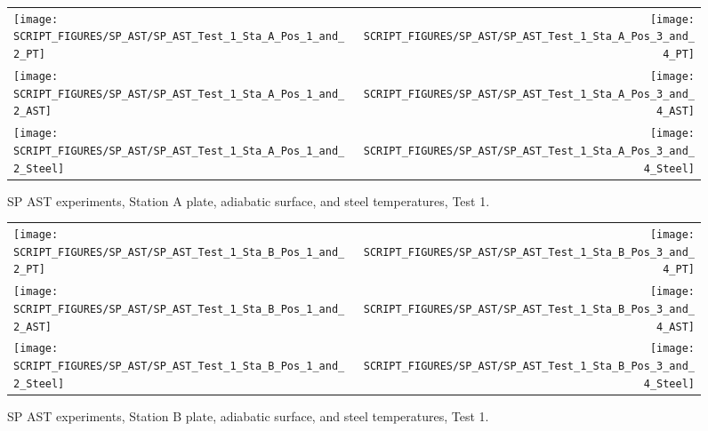 \newpage


\begin{figure}[p]
\begin{tabular*}{\textwidth}{l@{\extracolsep{\fill}}r}
\texttt{[image: SCRIPT\_FIGURES/SP\_AST/SP\_AST\_Test\_1\_Sta\_A\_Pos\_1\_and\_2\_PT]} &
\texttt{[image: SCRIPT\_FIGURES/SP\_AST/SP\_AST\_Test\_1\_Sta\_A\_Pos\_3\_and\_4\_PT]} \\
\texttt{[image: SCRIPT\_FIGURES/SP\_AST/SP\_AST\_Test\_1\_Sta\_A\_Pos\_1\_and\_2\_AST]} &
\texttt{[image: SCRIPT\_FIGURES/SP\_AST/SP\_AST\_Test\_1\_Sta\_A\_Pos\_3\_and\_4\_AST]} \\
\texttt{[image: SCRIPT\_FIGURES/SP\_AST/SP\_AST\_Test\_1\_Sta\_A\_Pos\_1\_and\_2\_Steel]} &
\texttt{[image: SCRIPT\_FIGURES/SP\_AST/SP\_AST\_Test\_1\_Sta\_A\_Pos\_3\_and\_4\_Steel]}
\end{tabular*}
\caption[SP AST experiments, Station A plate, adiabatic surface, and steel temperatures, Test 1]{SP AST experiments, Station A plate, adiabatic surface, and steel temperatures, Test 1.}
\label{SP_Test_1_Station_A}
\end{figure}

\begin{figure}[p]
\begin{tabular*}{\textwidth}{l@{\extracolsep{\fill}}r}
\texttt{[image: SCRIPT\_FIGURES/SP\_AST/SP\_AST\_Test\_1\_Sta\_B\_Pos\_1\_and\_2\_PT]} &
\texttt{[image: SCRIPT\_FIGURES/SP\_AST/SP\_AST\_Test\_1\_Sta\_B\_Pos\_3\_and\_4\_PT]} \\
\texttt{[image: SCRIPT\_FIGURES/SP\_AST/SP\_AST\_Test\_1\_Sta\_B\_Pos\_1\_and\_2\_AST]} &
\texttt{[image: SCRIPT\_FIGURES/SP\_AST/SP\_AST\_Test\_1\_Sta\_B\_Pos\_3\_and\_4\_AST]} \\
\texttt{[image: SCRIPT\_FIGURES/SP\_AST/SP\_AST\_Test\_1\_Sta\_B\_Pos\_1\_and\_2\_Steel]} &
\texttt{[image: SCRIPT\_FIGURES/SP\_AST/SP\_AST\_Test\_1\_Sta\_B\_Pos\_3\_and\_4\_Steel]}
\end{tabular*}
\caption[SP AST experiments, Station B plate, adiabatic surface, and steel temperatures, Test 1]{SP AST experiments, Station B plate, adiabatic surface, and steel temperatures, Test 1.}
\label{SP_Test_1_Station_B}
\end{figure}

